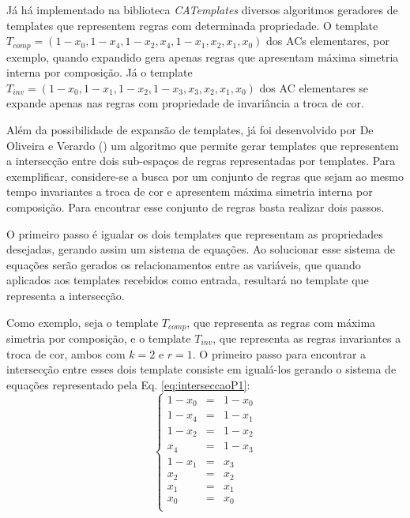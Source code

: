 \documentclass[12pt, a4paper]{article}
\begin{document}
Já há implementado na biblioteca \textit{CATemplates} \cite{CATemplates} diversos algoritmos geradores de templates que representem regras com determinada propriedade. O template $T_{comp} = (1 - x_0, 1 - x_4, 1 - x_2, x_4, 1 - x_1, x_2, x_1, x_0)$ dos ACs elementares, por exemplo, quando expandido gera apenas regras que apresentam máxima simetria interna por composição. Já o template $T_{inv} = (1 - x_0, 1 - x_1, 1 - x_2, 1 - x_3, x_3, x_2, x_1, x_0)$ dos AC elementares se expande apenas nas regras com propriedade de invariância a troca de cor.

Além da possibilidade de expansão de templates, já foi desenvolvido por De Oliveira e Verardo (\citeyear{deOliveira2014b}) um algoritmo que permite gerar templates que representem a intersecção entre dois sub-espaços de regras representadas por templates. Para exemplificar, considere-se a busca por um conjunto de regras que sejam ao mesmo tempo invariantes a troca de cor e apresentem máxima simetria interna por composição. Para encontrar esse conjunto de regras basta realizar dois passos.

O primeiro passo é igualar os dois templates que representam as propriedades desejadas, gerando assim um sistema de equações. Ao solucionar esse sistema de equações serão gerados os relacionamentos entre as variáveis, que quando aplicados aos templates recebidos como entrada, resultará no template que representa a intersecção.

Como exemplo, seja o template $T_{comp}$, que representa as regras com máxima simetria por composição, e o template $T_{inv}$, que representa as regras invariantes a troca de cor, ambos com $k=2$ e $r=1$. O primeiro passo para encontrar a intersecção entre esses dois template consiste em igualá-los gerando o sistema de equações representado pela Eq. \ref{eq:interseccaoP1}:
\begin{equation}
\left\{\begin{matrix}
1 - x_0	& = & 1 - x_0	\\
1 - x_4	& = & 1 - x_1	\\
1 - x_2	& = & 1 - x_2	\\
x_4		& = & 1 - x_3	\\
1 - x_1	& = & x_3		\\
x_2		& = & x_2		\\
x_1		& = & x_1		\\
x_0		& = & x_0		\\
\end{matrix}\right.
\label{eq:interseccaoP1}
\end{equation}
\end{document}
